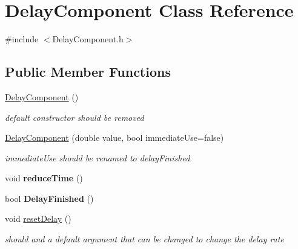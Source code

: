 \hypertarget{class_delay_component}{}\section{Delay\+Component Class Reference}
\label{class_delay_component}


{\ttfamily \#include $<$Delay\+Component.\+h$>$}

\subsection*{Public Member Functions}
\begin{DoxyCompactItemize}
\item 
\mbox{\label{class_delay_component_adcfaeb65d23778a3468156b34140c7f5}} 
\hyperlink{class_delay_component_adcfaeb65d23778a3468156b34140c7f5}{Delay\+Component} ()
\begin{DoxyCompactList}\small\item\em default constructor should be removed \end{DoxyCompactList}\item 
\mbox{\label{class_delay_component_aab69fe25b426b7ac1696840ad1f56c35}} 
\hyperlink{class_delay_component_aab69fe25b426b7ac1696840ad1f56c35}{Delay\+Component} (double value, bool immediate\+Use=false)
\begin{DoxyCompactList}\small\item\em immediate\+Use should be renamed to delay\+Finished \end{DoxyCompactList}\item 
\mbox{\label{class_delay_component_ac2c7023f723523ba2e42ae047d9b6092}} 
void {\bfseries reduce\+Time} ()
\item 
\mbox{\label{class_delay_component_a8942e663b1a92471ea79f0e7203d30bc}} 
bool {\bfseries Delay\+Finished} ()
\item 
\mbox{\label{class_delay_component_a539b563338fb30932c96f087dd7a0f5b}} 
void \hyperlink{class_delay_component_a539b563338fb30932c96f087dd7a0f5b}{reset\+Delay} ()
\begin{DoxyCompactList}\small\item\em should and a default argument that can be changed to change the delay rate \end{DoxyCompactList}\end{DoxyCompactItemize}
